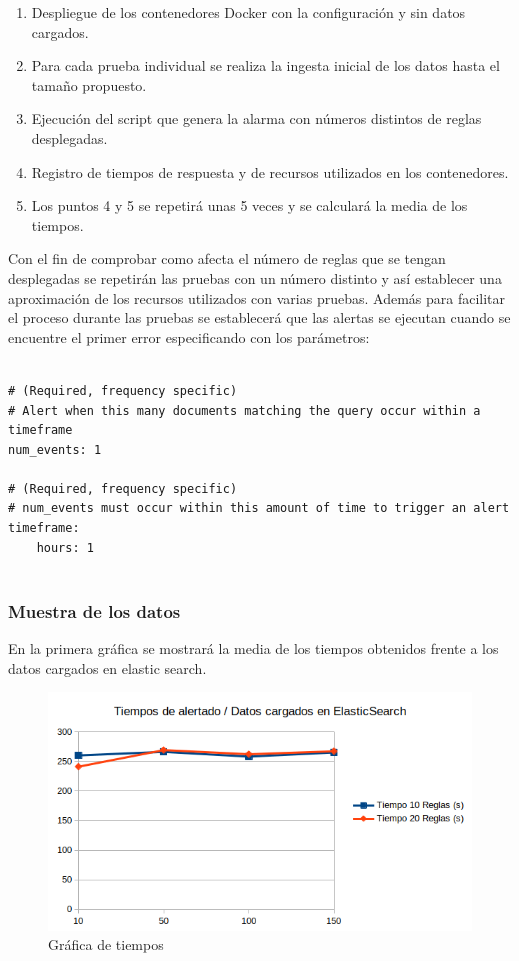 \begin{enumerate}
	\item Despliegue de los contenedores Docker con la configuración y sin datos cargados.
	\item Para cada prueba individual se realiza la ingesta inicial de los datos   hasta el tamaño propuesto.
	\item Ejecución del script que genera la alarma con números distintos de reglas desplegadas.
	\item Registro de tiempos de respuesta y de recursos utilizados en los contenedores.
	\item Los puntos 4 y 5 se repetirá unas 5 veces y se calculará la media de los tiempos.
\end{enumerate}


Con el fin de comprobar como afecta el número de reglas que se tengan desplegadas se repetirán las pruebas con un número distinto y así establecer una aproximación de los recursos utilizados con varias pruebas. Además para facilitar el proceso durante las pruebas se establecerá que las alertas se ejecutan cuando se encuentre el primer error especificando con los parámetros:

\begin{verbatim}

# (Required, frequency specific)
# Alert when this many documents matching the query occur within a timeframe
num_events: 1

# (Required, frequency specific)
# num_events must occur within this amount of time to trigger an alert
timeframe:
    hours: 1
    
\end{verbatim}


\subsubsection{Muestra de los datos}

En la primera gráfica se mostrará la media de los tiempos obtenidos frente a los datos cargados en elastic search.

\begin{figure}[H]
\centerline{\includegraphics[width=15cm]{figuras/GraficaTiempos.png}}
\caption{Gráfica de tiempos}
\label{enlace1}
\end{figure}

